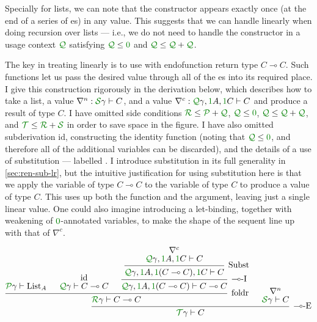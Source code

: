 \begin{example}
  Specially for lists, we can note that the  constructor appears
  exactly once (at the end of a series of es) in any value.
  This suggests that we can handle  linearly when doing recursion
  over lists --- i.e., we do not need to handle the  constructor in
  a usage context $\grQ$ satisfying $\grQ \leq \gr0$ and
  $\grQ \leq \grQ + \grQ$.

  The key in treating  linearly is to use  with
  endofunction return type $C \multimap C$.
  Such functions let us pass the desired  value through all of the
  es into its required place.
  I give this construction rigorously in the derivation below, which describes
  how to take a list, a  value $\nabla^n : \grS\gamma \vdash C$,
  and a  value $\nabla^c : \grQ\gamma, \gr1A, \gr1C \vdash C$ and
  produce a result of type $C$.
  I have omitted side conditions
  $\grR \leq \grP + \grQ$, $\grQ \leq \gr0$, $\grQ \leq \grQ + \grQ$, and
  $\grT \leq \grR + \grS$ in order to save space in the figure.
  I have also omitted subderivation $\mathrm{id}$, constructing the identity
  function (noting that $\grQ \leq \gr0$, and therefore all of the additional
  variables can be discarded), and the details of a use of substitution ---
  labelled .
  I introduce substitution in its full generality in \cref{sec:ren-sub-lr}, but
  the intuitive justification for using substitution here is that we apply the
  variable of type $C \multimap C$ to the variable of type $C$ to produce a
  value of type $C$.
  This uses up both the function and the argument, leaving just a single linear
  value.
  One could also imagine introducing a let-binding, together with weakening of
  $\gr0$-annotated variables, to make the shape of the sequent line up with that
  of $\nabla^c$.

  \begin{displaymath}
    \begin{prooftree}
      \hypo{\grP\gamma \vdash \mathrm{List}_A}
      \hypo{\mathrm{id}}
      \infer[no rule]1{\grQ\gamma \vdash C \multimap C}
      \hypo{\nabla^c}
      \infer[no rule]1{\grQ\gamma, \gr1A, \gr1C \vdash C}
      \infer1[Subst]{\grQ\gamma, \gr1A, \gr1\plr{C \multimap C}, \gr1C \vdash C}
      \infer1[$\multimap$-I]{\grQ\gamma, \gr1A, \gr1\plr{C \multimap C} \vdash C \multimap C}
      \infer3[foldr]{\grR\gamma \vdash C \multimap C}
      \hypo{\nabla^n}
      \infer[no rule]1{\grS\gamma \vdash C}
      \infer2[$\multimap$-E]{\grT\gamma \vdash C}
    \end{prooftree}
  \end{displaymath}


\end{example}
